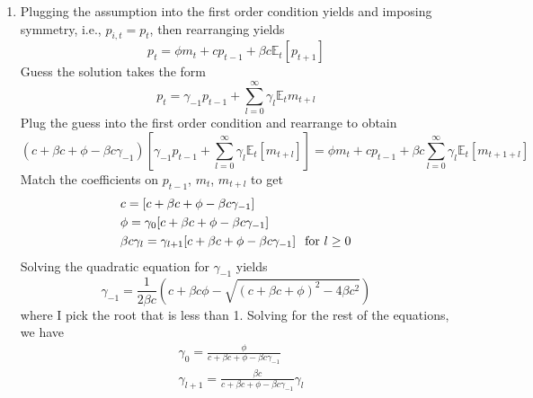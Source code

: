 \documentclass[11pt]{amsart}
\begin{document}
\begin{enumerate}[label = (\alph*)]
	\item
	Plugging the assumption into the first order condition yields and imposing symmetry, i.e., $p_{i,t} = p_t$, then rearranging yields
	\begin{equation*}
		[c + \beta c + \phi)] p_t = \phi m_t + c p_{t-1} + \beta c \mathbb{E}_t [p_{t+1}] 
	\end{equation*}
	Guess the solution takes the form
	\begin{equation*}
		p_t = \gamma_{-1} p_{t-1} + \sum_{l=0}^\infty \gamma_l \mathbb{E}_t m_{t+l}
	\end{equation*}
	Plug the guess into the first order condition and rearrange to obtain
	\begin{dmath*}
		(c + \beta c + \phi - \beta c \gamma_{-1}) \left[ \gamma_{-1} p_{t-1} + \sum_{l=0}^\infty \gamma_l \mathbb{E}_t [m_{t+l}] \right] = \phi m_t + c p_{t-1} + \beta c \sum_{l=0}^\infty \gamma_l \mathbb{E}_t [m_{t+1+l}]
	\end{dmath*}
	Match the coefficients on $p_{t-1}$, $m_t$, $m_{t+l}$ to get
	\begin{align*}
		&c = [c + \beta c + \phi - \beta c \gamma_{-1}] \\
		&\phi = \gamma_0 [c + \beta c + \phi - \beta c \gamma_{-1}] \\
		&\beta c \gamma_l = \gamma_{l+1} [c + \beta c + \phi - \beta c \gamma_{-1}] \hspace{0.1in} \text{for $l \geq 0$}
	\end{align*}
	Solving the quadratic equation for $\gamma_{-1}$ yields
	\begin{equation*}
		\gamma_{-1} = \frac{1}{2 \beta c} \left( c + \beta c \phi - \sqrt{(c+\beta c + \phi)^2 - 4 \beta c^2} \right)
	\end{equation*}
	where I pick the root that is less than 1. Solving for the rest of the equations, we have
	\begin{align*}
		&\gamma_0 = \frac{\phi}{c + \beta c + \phi - \beta c \gamma_{-1}} \\
		&\gamma_{l+1} = \frac{\beta c}{c + \beta c + \phi - \beta c \gamma_{-1}} \gamma_l
	\end{align*}


\end{enumerate}
\end{document}
